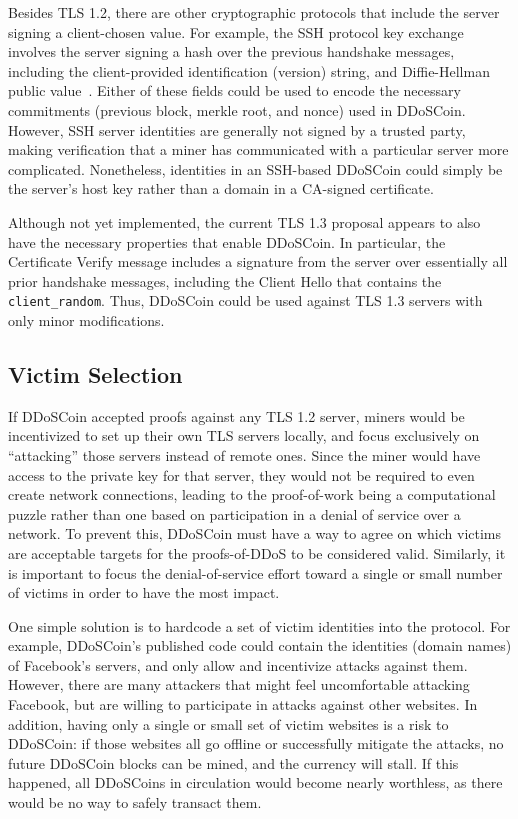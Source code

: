 Besides TLS 1.2, there are other cryptographic protocols that include the server
signing a client-chosen value. For example, the SSH protocol key exchange
involves the server signing a hash over the previous handshake messages,
including the client-provided identification (version) string, and
Diffie-Hellman public value~\cite{rfc4253}. Either of these fields could be used
to encode the necessary commitments (previous block, merkle root, and nonce)
used in DDoSCoin.  However, SSH server identities are generally not signed by a
trusted party, making verification that a miner has communicated with a
particular server more complicated.  Nonetheless, identities in an SSH-based
DDoSCoin could simply be the server's host key rather than a domain in a
CA-signed certificate.

Although not yet implemented, the current TLS 1.3 proposal appears to also have the
necessary properties that enable DDoSCoin. In particular, the
Certificate Verify message includes a signature from the server over essentially
all prior handshake messages, including the Client Hello that contains the
\texttt{client\_random}. Thus, DDoSCoin could be used against TLS 1.3
servers with only minor modifications.

\subsection{Victim Selection}
\label{sec:victim}

If DDoSCoin accepted proofs against any TLS 1.2 server, miners would be
incentivized to set up their own TLS servers locally, and focus exclusively on
``attacking'' those servers instead of remote ones. Since the miner would have
access to the private key for that server, they would not be required to even
create network connections, leading to the proof-of-work being a computational
puzzle rather than one based on participation in a denial of service over a
network.
To prevent this, DDoSCoin must have a way to agree on which victims are
acceptable targets for the proofs-of-DDoS to be considered valid. Similarly, it
is important to focus the denial-of-service effort toward a single or small
number of victims in order to have the most impact.

One simple solution is to hardcode a set of victim identities into the
protocol.  For example, DDoSCoin's published code could contain the identities
(domain names)
of Facebook's servers, and only allow and incentivize attacks
against them. However, there are many attackers that might feel uncomfortable
attacking Facebook, but are willing to participate in attacks against other
websites. In addition, having only a single or small set of victim websites is a
risk to DDoSCoin: if those websites all go offline or successfully mitigate the
attacks, no future DDoSCoin blocks can be mined, and
the currency will stall. If this happened, all DDoSCoins in circulation would
become nearly worthless, as there would be no way to safely transact them.

